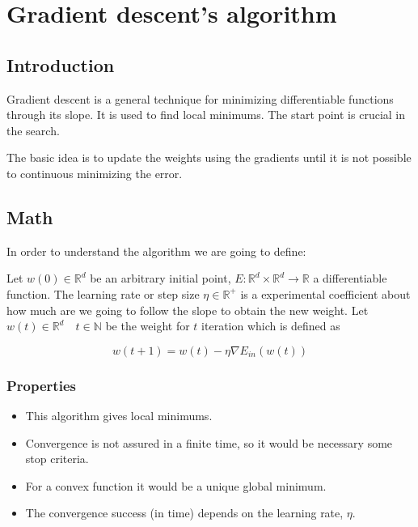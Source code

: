 

\section{ Gradient descent's algorithm }
\subsection{Introduction}

Gradient descent is a general technique for minimizing  differentiable functions through its slope. \cite{LFD}
It is used to find local minimums. The start point is crucial in the search.  

The basic idea is to update the weights using the gradients until it is not possible to continuous minimizing the error.


\medskip

\subsection{Math}

In order to understand the algorithm we are going to define: 

Let $w(0) \in \mathbb{R}^d$ be an arbitrary initial point,
$E : \mathbb{R}^d \times \mathbb{R}^d \longrightarrow \mathbb R$
a differentiable function. The learning rate or step size $\eta \in \mathbb{R}^+$
is a experimental coefficient about how much are we going to follow the slope to obtain the new weight.  
Let  $w(t) \in \mathbb{R}^d  \quad t \in \mathbb N$ be the weight for $t$ iteration which is defined as

\begin{equation*}
  w(t+1) = w(t) - \eta \nabla E_{in}(w(t))
\end{equation*}

\subsubsection{ Properties}

\begin{itemize}
\item This algorithm gives local minimums.
\item Convergence is not assured in a finite time, so it would be necessary some stop criteria. 
\item For a convex function it would be a unique global minimum.
\item The convergence success (in time) depends on the learning rate, $\eta$. 
\end{itemize}


